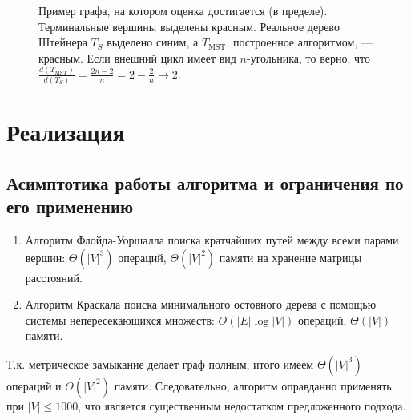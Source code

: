 \documentclass[11pt,a4paper]{report}
\def\le{\leqslant}
\theoremstyle{definition}
\theoremstyle{definition}
\theoremstyle{definition}
\begin{document}
	\clearpage
	\begin{figure}[!hbtp]
	\centering
		\caption{  Пример графа, на котором оценка достигается (в пределе). Терминальные вершины выделены красным. Реальное дерево Штейнера $ T_{S} $ выделено синим, а $ T_{\mathrm{MST}} $, построенное алгоритмом, — красным. Если внешний цикл имеет вид $n$-угольника, то верно, что $ \frac{d(T_{\mathrm{MST}})}{d(T_{S})} = \frac{2n-2}{n} = 2 - \frac{2}{n} \to 2 $. } 
	\end{figure}
	\section{Реализация}
	\subsection{Асимптотика работы алгоритма и ограничения по его применению}
	\begin{enumerate}
		\item Алгоритм Флойда-Уоршалла поиска кратчайших путей между всеми парами вершин: $\Theta(|V|^3)$ операций, $ \Theta(|V|^2) $ памяти на хранение матрицы расстояний. 
		\item Алгоритм Краскала поиска минимального остовного дерева с помощью системы непересекающихся множеств: $O(|E| \log |V|)$ операций, $ \Theta(|V|) $ памяти. 
	\end{enumerate}
	Т.к. метрическое замыкание делает граф полным, итого имеем $ \Theta(|V|^3) $ операций и $\Theta(|V|^2)$ памяти. Следовательно, алгоритм оправданно применять при $ |V| \le 1000 $, что является существенным недостатком предложенного подхода.\\
	
\end{document}
